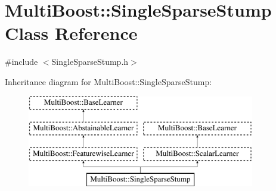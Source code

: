 \hypertarget{classMultiBoost_1_1SingleSparseStump}{
\section{MultiBoost::SingleSparseStump Class Reference}
\label{classMultiBoost_1_1SingleSparseStump}
}


{\ttfamily \#include $<$SingleSparseStump.h$>$}

Inheritance diagram for MultiBoost::SingleSparseStump:\begin{figure}[H]
\begin{center}
\leavevmode
\includegraphics[height=4.000000cm]{classMultiBoost_1_1SingleSparseStump}
\end{center}
\end{figure}
